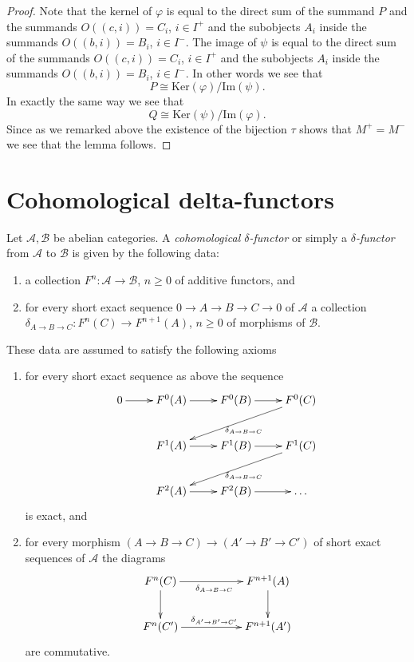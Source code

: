 \begin{proof}
\medskip\noindent
Note that the kernel of $\varphi$ is equal to the direct sum of the
summand $P$ and the summands $O((c, i)) = C_i$, $i \in I^{+}$ and
the subobjects $A_i$ inside the summands $O((b, i)) = B_i$, $i \in I^{-}$.
The image of $\psi$ is equal to the direct sum of the
summands $O((c, i)) = C_i$, $i \in I^{+}$ and
the subobjects $A_i$ inside the summands $O((b, i)) = B_i$, $i \in I^{-}$.
In other words we see that
$$
P \cong \text{Ker}(\varphi)/\text{Im}(\psi).
$$
In exactly the same way we see that
$$
Q \cong \text{Ker}(\psi)/\text{Im}(\varphi).
$$
Since as we remarked above the existence of the bijection
$\tau$ shows that $M^{+} = M^{-}$ we see that the lemma follows.
\end{proof}





\section{Cohomological delta-functors}
\label{section-cohomological-delta-functor}

\begin{definition}
\label{definition-cohomological-delta-functor}
Let $\mathcal{A}, \mathcal{B}$ be abelian categories.
A {\it cohomological $\delta$-functor} or simply a
{\it $\delta$-functor} from $\mathcal{A}$
to $\mathcal{B}$ is given by the following data:
\begin{enumerate}
\item a collection $F^n : \mathcal{A} \to \mathcal{B}$, $n \geq 0$ of additive
functors, and
\item for every short exact sequence $0 \to A \to B \to C \to 0$
of $\mathcal{A}$
a collection $\delta_{A \to B \to C} : F^n(C) \to F^{n + 1}(A)$, $n \geq 0$
of morphisms of $\mathcal{B}$.
\end{enumerate}
These data are assumed to satisfy the following axioms
\begin{enumerate}
\item for every short exact sequence as above the sequence
$$
\xymatrix{
0 \ar[r] &
F^0(A) \ar[r] &
F^0(B) \ar[r] &
F^0(C) \ar[lld]^{\delta_{A \to B \to C}} \\
 &
F^1(A) \ar[r] &
F^1(B) \ar[r] &
F^1(C) \ar[lld]^{\delta_{A \to B \to C}} \\
 &
F^2(A) \ar[r] &
F^2(B) \ar[r] &
\ldots
}
$$
is exact, and
\item for every morphism $(A \to B \to C) \to (A' \to B' \to C')$
of short exact sequences of $\mathcal{A}$ the diagrams
$$
\xymatrix{
F^n(C) \ar[d] \ar[rr]_{\delta_{A \to B \to C}} & & F^{n + 1}(A) \ar[d] \\
F^n(C') \ar[rr]^{\delta_{A' \to B' \to C'}} & & F^{n + 1}(A')
}
$$
are commutative.
\end{enumerate}
\end{definition}

